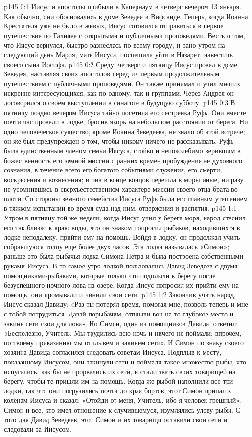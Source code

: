 \vs p145 0:1 Иисус и апостолы прибыли в Капернаум в четверг вечером 13 января. Как обычно, они обосновались в доме Зеведея в Вифсаиде. Теперь, когда Иоанна Крестителя уже не было в живых, Иисус готовился отправиться в первое путешествие по Галилее с открытыми и публичными проповедями. Весть о том, что Иисус вернулся, быстро разнеслась по всему городу, и рано утром на следующий день Мария, мать Иисуса, поспешила уйти в Назарет, навестить своего сына Иосифа.
\vs p145 0:2 Среду, четверг и пятницу Иисус провел в доме Зеведея, наставляя своих апостолов перед их первым продолжительным путешествием с публичными проповедями. Он также принимал и учил многих искренне интересующихся, как по одному, так и группами. Через Андрея он договорился о своем выступлении в синагоге в будущую субботу.
\vs p145 0:3 В пятницу поздно вечером Иисуса тайно посетила его сестренка Руфь. Они вместе почти час провели в лодке, бросив якорь на небольшом расстоянии от берега. Ни одно человеческое существо, кроме Иоанна Зеведеева, не знало об этой встрече; он же был предупрежден о том, чтобы никому ничего не рассказывать. Руфь была единственным членом семьи Иисуса, стойко и непоколебимо верившим в божественность его земной миссии с ранних времен пробуждения ее духовного сознания, в течение всего его богатого событиями служения, его смерти, воскресения и вознесения; и она в конце концов перешла в миры иные, ни разу не усомнившись в сверхъестественном характере миссии своего отца\hyp{}брата во плоти. Со стороны земного семейства Иисуса Руфь была его главным утешением в тяжком испытании во время суда над ним, отвержения и распятия.
\vs p145 1:1 Утром в пятницу той же недели, когда Иисус учил у берега моря, народ стеснил его так близко к краю воды, что он знаком попросил рыбаков, находившихся в лодке неподалеку, прийти ему на помощь. Войдя в лодку, он продолжал учить собравшуюся толпу еще более двух часов. Эта лодка называлась «Симон»; раньше это была рыбачья лодка Симона Петра и была построена собственными руками Иисуса. В то самое утро лодкой пользовались Давид Зеведеев с двумя помощниками\hyp{}рыбаками, которые только что подплыли к берегу после безуспешного ночного лова на озере. Когда Иисус попросил их прийти ему на помощь, они промывали и чинили свои сети.
\vs p145 1:2 Закончив учить народ, Иисус сказал Давиду: «Раз ты потерял время, помогая мне, позволь теперь и мне с тобой потрудиться. Давай порыбачим; отплыви вон на то глубокое место и закинь сети свои для лова». Но Симон, один из помощников Давида, ответил: «Бесполезно, Учитель. Мы трудились всю ночь и ничего не поймали; впрочем, по твоему приказанию мы отплывем и закинем сети». И Симон по знаку своего хозяина Давида согласился следовать советам Иисуса. Подплыв к месту, показанному Иисусом, они закинули сети и поймали такое множество рыбы, что испугались, как бы не прорвались их сети, и стали звать своих товарищей на берегу, чтобы те пришли им на помощь. Когда же рыбой наполнили все три лодки, так что они погрузились почти до края бортов, этот Симон припал к коленам Иисуса и сказал: «Отойди от меня, Учитель, ибо я человек грешный». Симон и все, кто имел отношение к случившемуся, изумлялись улову рыбы. С того дня Давид Зеведеев, этот Симон и их товарищи оставили свои сети и следовали за Иисусом.
